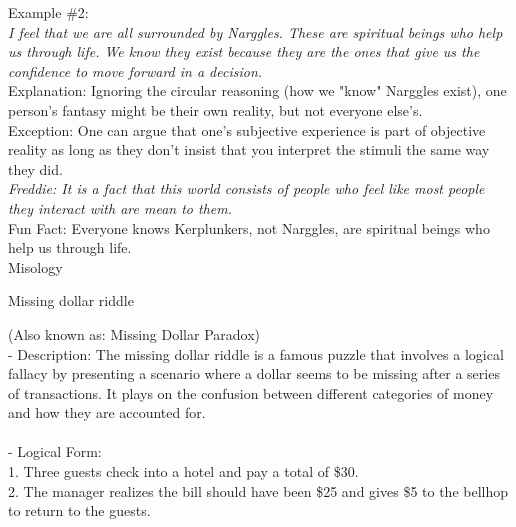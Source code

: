 \documentclass[a4paper,12pt,single,pdftex]{scrartcl}
\begin{document}
    
      Example \#2:
    \\

    
      {\em I feel that we are all surrounded by Narggles. These are spiritual beings who help us through life. We know they exist because they are the ones that give us the confidence to move forward in a decision.}
    \\

    
      Explanation: Ignoring the circular reasoning (how we "know" Narggles exist), one person's fantasy might be their own reality, but not everyone else's.
    \\

    
      Exception: One can argue that one's subjective experience is part of objective reality as long as they don’t insist that you interpret the stimuli the same way they did.
    \\

    
      {\em Freddie: It is a fact that this world consists of people who feel like most people they interact with are mean to them.}
    \\

    
      Fun Fact: Everyone knows Kerplunkers, not Narggles, are spiritual beings who help us through life.
    \\

  

Misology

Missing dollar riddle
    
      (Also known as: Missing Dollar Paradox)
    \\

  
    
      - Description: The missing dollar riddle is a famous puzzle that involves a logical fallacy by presenting a scenario where a dollar seems to be missing after a series of transactions. It plays on the confusion between different categories of money and how they are accounted for.
    \\

    
      
    \\

    
      - Logical Form:
    \\

    
        1. Three guests check into a hotel and pay a total of \$30.
    \\

    
        2. The manager realizes the bill should have been \$25 and gives \$5 to the bellhop to return to the guests.
    \\
\end{document}
